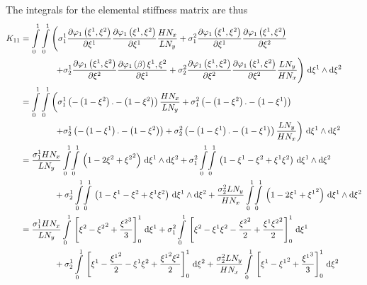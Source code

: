 The integrals for the elemental stiffness matrix are thus
\begin{equation}
  \begin{aligned}
    K_{11}&=\dintl{0}{1}\dintl{0}{1}\left(
    \conductivitytensorsymbol^{1}_{1}\delby{\lbfn{1}{\xione,\xitwo}}{\xione}
    \delby{\lbfn{1}{\xione,\xitwo}}{\xione}\dfrac{H N_{x}}{L N_{y}}+
    \conductivitytensorsymbol^{2}_{1}\delby{\lbfn{1}{\xione,\xitwo}}{\xione}
    \delby{\lbfn{1}{\xione,\xitwo}}{\xitwo}\right.\\
    &\qquad\qquad\left.+\conductivitytensorsymbol^{1}_{2}\delby{\lbfn{1}{\xione,\xitwo}}{\xitwo}
    \delby{\lbfn{1}{\beta}{\xione,\xitwo}}{\xione}+
    \conductivitytensorsymbol^{2}_{2}\delby{\lbfn{1}{\xione,\xitwo}}{\xitwo}
    \delby{\lbfn{1}{\xione,\xitwo}}{\xitwo}\dfrac{L N_{y}}{H N_{x}}\right)\infinitesimaltwo{\xione}{\xitwo}\\
    &=\dintl{0}{1}\dintl{0}{1}\left(
    \conductivitytensorsymbol^{1}_{1}\pbrac{-\pbrac{1-\xitwo}.-\pbrac{1-\xitwo}}\dfrac{H N_{x}}{L N_{y}}+
    \conductivitytensorsymbol^{2}_{1}\pbrac{-\pbrac{1-\xitwo}.-\pbrac{1-\xione}}\right.\\
    &\qquad\qquad\left.+\conductivitytensorsymbol^{1}_{2}\pbrac{-\pbrac{1-\xione}.-\pbrac{1-\xitwo}}+
    \conductivitytensorsymbol^{2}_{2}\pbrac{-\pbrac{1-\xione}.-\pbrac{1-\xione}}\dfrac{L N_{y}}{H N_{x}}\right)
    \infinitesimaltwo{\xione}{\xitwo}\\
    &=\dfrac{\conductivitytensorsymbol^{1}_{1} H N_{x}}{L N_{y}}\giint{0}{1}{0}{1}{\pbrac{1-2\xitwo+\xitwosq}}{\xione}{\xitwo}
    +\conductivitytensorsymbol^{2}_{1}\giint{0}{1}{0}{1}{\pbrac{1-\xione-\xitwo+\xione\xitwo}}{\xione}{\xitwo}\\
    &\qquad\qquad+\conductivitytensorsymbol^{1}_{2}\giint{0}{1}{0}{1}{\pbrac{1-\xione-\xitwo+\xione\xitwo}}{\xione}{\xitwo}
    +\dfrac{\conductivitytensorsymbol^{2}_{2} L N_{y}}{H N_{x}}\giint{0}{1}{0}{1}{\pbrac{1-2\xione+\xionesq}}{\xione}{\xitwo} \\
    &=\dfrac{\conductivitytensorsymbol^{1}_{1} H N_{x}}{L N_{y}}\gint{0}{1}{\sqbrac{\xitwo-\xitwosq+\dfrac{\xitwocube}{3}}^{1}_{0}}{\xione}
    +\conductivitytensorsymbol^{2}_{1}\gint{0}{1}{\sqbrac{\xitwo-\xione\xitwo-\dfrac{\xitwosq}{2}+\dfrac{\xione\xitwosq}{2}}^{1}_{0}}{\xione}\\
    &\qquad\qquad+\conductivitytensorsymbol^{1}_{2}\gint{0}{1}{\sqbrac{\xione-\dfrac{\xionesq}{2}-\xione\xitwo+\dfrac{\xionesq\xitwo}{2}}^{1}_{0}}{\xitwo}
    +\dfrac{\conductivitytensorsymbol^{2}_{2} L N_{y}}{H N_{x}}\gint{0}{1}{\sqbrac{\xione-\xionesq+\dfrac{\xionecube}{3}}^{1}_{0}}{\xitwo} \\

\end{aligned}
\end{equation}
